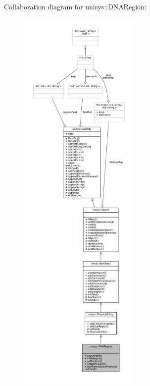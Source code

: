 Collaboration diagram for unisys\-:\-:D\-N\-A\-Region\-:
\nopagebreak
\begin{figure}[H]
\begin{center}
\leavevmode
\includegraphics[height=550pt]{classunisys_1_1DNARegion__coll__graph}
\end{center}
\end{figure}
